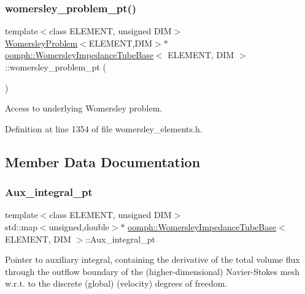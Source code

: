 \subsubsection{\texorpdfstring{womersley\+\_\+problem\+\_\+pt()}{womersley\_problem\_pt()}}
{\footnotesize\ttfamily template$<$class E\+L\+E\+M\+E\+NT, unsigned D\+IM$>$ \\
\hyperlink{classoomph_1_1WomersleyProblem}{Womersley\+Problem}$<$E\+L\+E\+M\+E\+NT,D\+IM$>$$\ast$ \hyperlink{classoomph_1_1WomersleyImpedanceTubeBase}{oomph\+::\+Womersley\+Impedance\+Tube\+Base}$<$ E\+L\+E\+M\+E\+NT, D\+IM $>$\+::womersley\+\_\+problem\+\_\+pt (\begin{DoxyParamCaption}{ }\end{DoxyParamCaption})\hspace{0.3cm}{\ttfamily [inline]}}



Access to underlying Womersley problem. 



Definition at line 1354 of file womersley\+\_\+elements.\+h.



\subsection{Member Data Documentation}
\mbox{\label{classoomph_1_1WomersleyImpedanceTubeBase_ad8b569812e4c3fa5ae6c1064689bb2fe}} 
\subsubsection{\texorpdfstring{Aux\+\_\+integral\+\_\+pt}{Aux\_integral\_pt}}
{\footnotesize\ttfamily template$<$class E\+L\+E\+M\+E\+NT, unsigned D\+IM$>$ \\
std\+::map$<$unsigned,double$>$$\ast$ \hyperlink{classoomph_1_1WomersleyImpedanceTubeBase}{oomph\+::\+Womersley\+Impedance\+Tube\+Base}$<$ E\+L\+E\+M\+E\+NT, D\+IM $>$\+::Aux\+\_\+integral\+\_\+pt\hspace{0.3cm}{\ttfamily [protected]}}



Pointer to auxiliary integral, containing the derivative of the total volume flux through the outflow boundary of the (higher-\/dimensional) Navier-\/\+Stokes mesh w.\+r.\+t. to the discrete (global) (velocity) degrees of freedom. 



